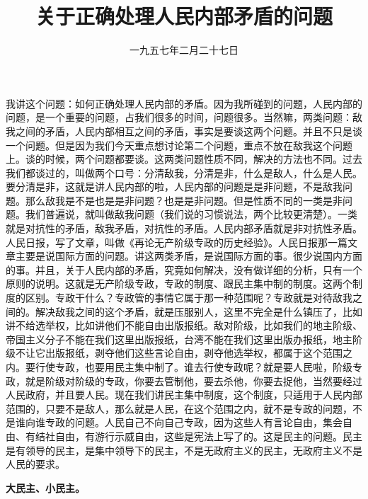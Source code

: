 
\title{关于正确处理人民内部矛盾的问题}
\date{一九五七年二月二十七日}
\maketitle




我讲这个问题：如何正确处理人民内部的矛盾。因为我所碰到的问题，人民内部的问题，是一个重要的问题，占我们很多的时间，问题很多。当然嘛，两类问题：敌我之间的矛盾，人民内部相互之间的矛盾，事实是要谈这两个问题。并且不只是谈一个问题。但是因为我们今天重点想讨论第二个问题，重点不放在敌我这个问题上。谈的时候，两个问题都要谈。这两类问题性质不同，解决的方法也不同。过去我们都谈过的，叫做两个口号：分清敌我，分清是非，什么是敌人，什么是人民。要分清是非，这就是讲人民内部的啦，人民内部的问题是是非问题，不是敌我问题。那么敌我是不是也是是非问题？也是是非问题。但是性质不同的一类是非问题。我们普遍说，就叫做敌我问题（我们说的习惯说法，两个比较更清楚）。一类就是对抗性的矛盾，敌我矛盾，对抗性的矛盾。人民内部矛盾就是非对抗性矛盾。人民日报，写了文章，叫做《再论无产阶级专政的历史经验》。人民日报那一篇文章主要是说国际方面的问题。讲这两类矛盾，是说国际方面的事。很少说国内方面的事。并且，关于人民内部的矛盾，究竟如何解决，没有做详细的分析，只有一个原则的说明。这就是无产阶级专政，专政的制度、跟民主集中制的制度。这两个制度的区别。专政干什么？专政管的事情它属于那一种范围呢？专政就是对待敌我之间的。解决敌我之间的这个矛盾，就是压服别人，这里不完全是什么镇压了，比如讲不给选举权，比如讲他们不能自由出版报纸。敌对阶级，比如我们的地主阶级、帝国主义分子不能在我们这里出版报纸，台湾不能在我们这里出版办报纸，地主阶级不让它出版报纸，剥夺他们这些言论自由，剥夺他选举权，都属于这个范围之内。要行使专政，也要用民主集中制了。谁去行使专政呢？就是要人民啦，阶级专政，就是阶级对阶级的专政，你要去管制他，要去杀他，你要去捉他，当然要经过人民政府，并且要人民。现在我们讲民主集中制度，这个制度，只适用于人民内部范围的，只要不是敌人，那么就是人民，在这个范围之内，就不是专政的问题，不是谁向谁专政的问题。人民自己不向自己专政，因为这些人有言论自由，集会自由、有结社自由，有游行示威自由，这些是宪法上写了的。这是民主的问题。民主是有领导的民主，是集中领导下的民主，不是无政府主义的民主，无政府主义不是人民的要求。

\textbf{大民主、小民主。}

